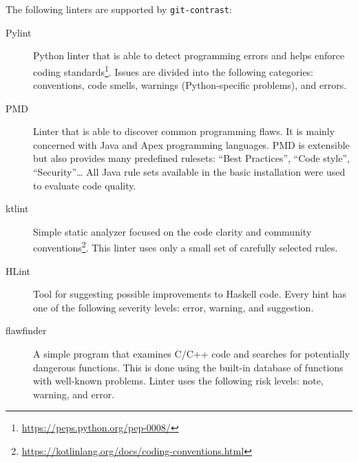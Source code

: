 \documentclass[digital,oneside,oldtable,nolof,nolot,nocover]{fithesis4}
\begin{document}
The following linters are supported by \texttt{git-contrast}:
\begin{description}
\item[{Pylint}] Python linter that is able to detect programming errors and helps
enforce coding standards\footnote{\url{https://peps.python.org/pep-0008/}}.
Issues are divided into the following categories: conventions, code smells,
warnings (Python-specific problems), and errors.
\item[{PMD}] Linter that is able to discover common programming flaws. It is mainly
concerned with Java and Apex programming languages. PMD is extensible but also
provides many predefined rulesets: ``Best Practices'', ``Code style'', ``Security''\dots{}
All Java rule sets available in the basic installation were used to evaluate code quality.
\item[{ktlint}] Simple static analyzer focused on the code clarity and community
conventions\footnote{\url{https://kotlinlang.org/docs/coding-conventions.html}}.
This linter uses only a small set of carefully selected rules.
\item[{HLint}] Tool for suggesting possible improvements to Haskell code.
Every hint has one of the following severity levels: error, warning, and suggestion.
\item[{flawfinder}] A simple program that examines C/C++ code and searches for potentially
dangerous functions. This is done using the built-in database of functions with
well-known problems. Linter uses the following risk levels: note, warning, and error.
\end{description}
\end{document}
